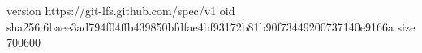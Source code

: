 version https://git-lfs.github.com/spec/v1
oid sha256:6baee3ad794f04ffb439850bfdfae4bf93172b81b90f73449200737140e9166a
size 700600
